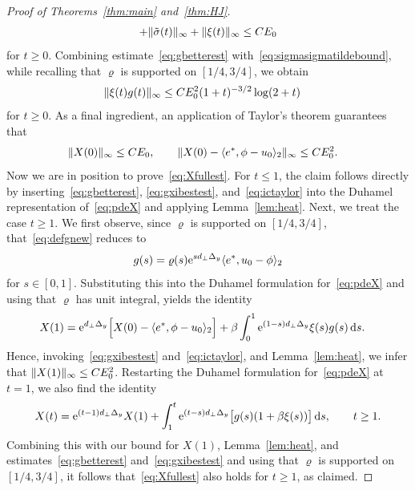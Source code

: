 \documentclass[12pt,oneside,a4paper,reqno]{amsart}
\numberwithin{equation}{section}
\theoremstyle{definition}
\theoremstyle{remark}
\newcommand{\rd}{{\,\rm{d}}}
\newcommand{\re}{{\rm e}}
\DeclarePairedDelimiter{\norm}{\lVert}{\rVert}
\DeclarePairedDelimiter{\sqr}{[}{]}
\begin{document}
\begin{proof}[Proof of Theorems~\ref{thm:main} and~\ref{thm:HJ}]
\begin{align}
        + \norm{\tilde{\sigma}(t)}_{\infty}
        + \norm{\xi(t)}_{\infty} \leq CE_0
    \end{align}
    for $t \geq 0$. Combining estimate~\eqref{eq:gbetterest} with~\eqref{eq:sigmasigmatildebound}, while recalling that $\varrho$ is supported on $[1/4,3/4]$, we obtain
    \begin{align}
        \label{eq:gxibestest}
        \norm{\xi(t)g(t)}_{\infty} &\leq C E_0^2 (1+t)^{-3/2} \log(2+t)
    \end{align}
    for $t \geq 0$. 
    As a final ingredient, an application of Taylor's theorem guarantees that
    \begin{align}
        \label{eq:ictaylor}
        \norm{X(0)}_{\infty} &\leq C E_0, \qquad        \norm{X(0) - \langle e^*,\phi - u_0 \rangle_2 }_{\infty} \leq CE_0^2.
    \end{align}
    Now we are in position to prove~\eqref{eq:Xfullest}.
    For $t \leq 1$, the claim follows directly by inserting~\eqref{eq:gbetterest}, \eqref{eq:gxibestest}, and~\eqref{eq:ictaylor} into the Duhamel representation of~\eqref{eq:pdeX} and applying Lemma~\ref{lem:heat}.
    Next, we treat the case $t \geq 1$.
    We first observe, since $\varrho$ is supported on $[1/4,3/4]$, that~\eqref{eq:defgnew} reduces to
    \begin{equation*}
        g(s) = \varrho(s)\re^{s d_{\bot}\Delta_y}\langle e^*,u_0 - \phi \rangle_2
    \end{equation*}
    for $s \in [0,1]$. Substituting this into the Duhamel formulation for~\eqref{eq:pdeX} and using that $\varrho$ has unit integral, yields the identity
    \begin{align*}
        X(1) &= \re^{d_{\bot}\Delta_y}\sqr[\Big]{X(0) -  \langle e^*,\phi - u_0 \rangle_2} 
        + \beta \int_0^1 \re^{(1 - s)d_{\bot}\Delta_y}\xi(s)g(s)\rd s.
    \end{align*}
    Hence, invoking~\eqref{eq:gxibestest} and~\eqref{eq:ictaylor}, and Lemma~\ref{lem:heat}, we infer that $\norm{X(1)}_{\infty} \leq C E_0^2$.
    Restarting the Duhamel formulation for~\eqref{eq:pdeX} at $t=1$, we also find the identity
    \begin{align*}
        X(t) = \re^{(t - 1)d_{\bot}\Delta_y}X(1) + \int_1^t \re^{(t - s)d_{\bot}\Delta_y}\sqr[\big]{g(s)(1+\beta\xi(s))}\rd s, \qquad t \geq 1.
    \end{align*}
    Combining this with our bound for $X(1)$, Lemma~\ref{lem:heat}, and estimates~\eqref{eq:gbetterest} and~\eqref{eq:gxibestest} and using that $\varrho$ is supported on $[1/4,3/4]$, it follows that~\eqref{eq:Xfullest} also holds for $t \geq 1$, as claimed.

\end{proof}
\end{document}
